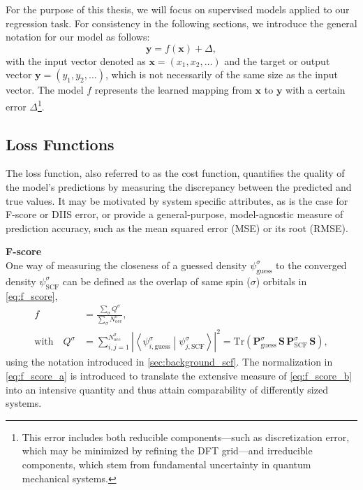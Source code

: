 For the purpose of this thesis, we will focus on supervised models applied to our regression task. For consistency in the following sections, we introduce the general notation for our model as follows:
\begin{equation}
    \label{eq:general_ML_model_formula}
    \mathbf{y} = f(\mathbf{x}) + \Delta,
\end{equation}
with the input vector denoted as $\mathbf{x} = (x_1, x_2, \dots)$ and the target or output vector $\mathbf{y} = (y_1, y_2, \dots)$, which is not necessarily of the same size as the input vector. The model $f$ represents the learned mapping from $\mathbf{x}$ to $\mathbf{y}$ with a certain 
error $\Delta$\footnote{This error includes both reducible components—such as discretization error, which may be minimized by refining the DFT grid—and irreducible components, which stem from fundamental uncertainty in quantum mechanical systems.}. 

\subsection{Loss Functions}
\label{subsec:background_loss_function}
The loss function, also referred to as the cost function, quantifies the quality of the model's predictions by measuring the discrepancy between the predicted and true values. It may be motivated by system specific attributes, as is the case for F-score or DIIS error, or provide a general-purpose, model-agnostic measure of prediction accuracy, such as the mean squared error (MSE) or its root (RMSE). 

\textbf{F-score}\\
One way of measuring the closeness of a guessed density $\psi^\sigma_{\text{guess}}$ to the converged density $\psi^\sigma_{\text{SCF}}$ can be defined as the overlap of same spin ($\sigma$) orbitals in \autoref{eq:f_score},
\begin{subequations}
\label{eq:f_score}
\begin{align}
    f &= \frac{\sum\limits_\sigma Q^\sigma}{\sum\limits_\sigma N^\sigma_\text{occ}}, \label{eq:f_score_a}\\
    \text{with} \quad Q^\sigma &= \sum_{i,j=1}^{N^\sigma_\text{occ}} \left| \left\langle \psi^\sigma_{i,\text{guess}} \middle| \psi^\sigma_{j,\text{SCF}} \right\rangle \right|^2 = \mathrm{Tr}\left( \mathbf{P}^{\sigma}_\text{guess} \, \mathbf{S} \, \mathbf{P}^{\sigma}_\text{SCF} \, \mathbf{S} \right),  \label{eq:f_score_b}
\end{align}
\end{subequations}
using the notation introduced in \autoref{sec:background_scf}. The normalization in \autoref{eq:f_score_a} is introduced to translate the extensive measure of \autoref{eq:f_score_b} into an intensive quantity and thus attain comparability of differently sized systems.


